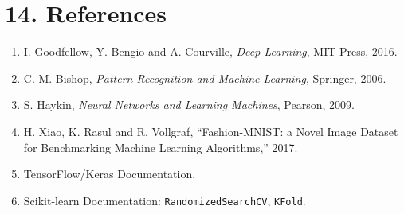 \documentclass[11pt]{article}
\begin{document}

\section*{14. References}

\begin{enumerate}
\item I. Goodfellow, Y. Bengio and A. Courville, \emph{Deep Learning}, MIT Press, 2016.
\item C. M. Bishop, \emph{Pattern Recognition and Machine Learning}, Springer, 2006.
\item S. Haykin, \emph{Neural Networks and Learning Machines}, Pearson, 2009.
\item H. Xiao, K. Rasul and R. Vollgraf, ``Fashion-MNIST: a Novel Image Dataset for Benchmarking Machine Learning Algorithms,'' 2017.
\item TensorFlow/Keras Documentation.
\item Scikit-learn Documentation: \texttt{RandomizedSearchCV}, \texttt{KFold}.
\end{enumerate}
\end{document}
